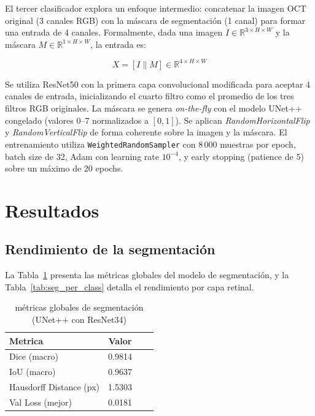 \documentclass[journal, twocolumn]{IEEEtran}
\begin{document}
El tercer clasificador explora un enfoque intermedio: concatenar la imagen OCT original (3 canales RGB) con la máscara de segmentación (1 canal) para formar una entrada de 4 canales. Formalmente, dada una imagen $I \in \mathbb{R}^{3 \times H \times W}$ y la máscara $M \in \mathbb{R}^{1 \times H \times W}$, la entrada es:

\begin{equation}
X = [I \| M] \in \mathbb{R}^{4 \times H \times W}
\end{equation}

Se utiliza ResNet50 con la primera capa convolucional modificada para aceptar 4 canales de entrada, inicializando el cuarto filtro como el promedio de los tres filtros RGB originales. La máscara se genera \textit{on-the-fly} con el modelo UNet++ congelado (valores 0--7 normalizados a $[0, 1]$). Se aplican \textit{RandomHorizontalFlip} y \textit{RandomVerticalFlip} de forma coherente sobre la imagen y la máscara. El entrenamiento utiliza \texttt{WeightedRandomSampler} con 8\,000 muestras por epoch, batch size de 32, Adam con learning rate $10^{-4}$, y early stopping (patience de 5) sobre un máximo de 20 epochs.

\section{Resultados}

\subsection{Rendimiento de la segmentación}

La Tabla~\ref{tab:seg_results} presenta las métricas globales del modelo de segmentación, y la Tabla~\ref{tab:seg_per_class} detalla el rendimiento por capa retinal.

\begin{table}[h]
\caption{métricas globales de segmentación (UNet++ con ResNet34)}
\label{tab:seg_results}
\centering
\begin{tabular}{lccc}
\toprule
\textbf{Metrica} & \textbf{Valor} \\
\midrule
Dice (macro)           & 0.9814 \\
IoU (macro)            & 0.9637 \\
Hausdorff Distance (px) & 1.5303 \\
Val Loss (mejor)       & 0.0181 \\
\bottomrule
\end{tabular}
\end{table}
\end{document}

